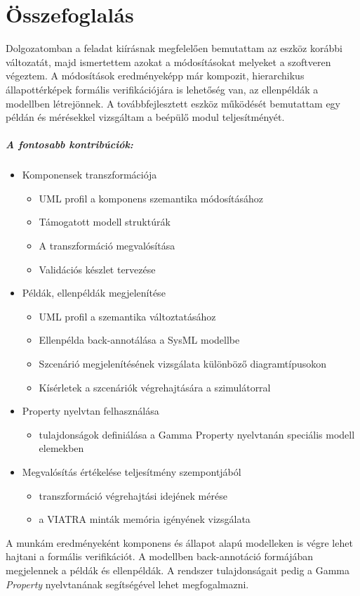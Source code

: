 \chapter{Összefoglalás}

Dolgozatomban a feladat kiírásnak megfelelően bemutattam az eszköz korábbi változatát, majd ismertettem azokat a módosításokat melyeket a szoftveren végeztem. A módosítások eredményeképp már kompozit, hierarchikus állapottérképek formális verifikációjára is lehetőség van, az ellenpéldák a modellben létrejönnek. A továbbfejlesztett eszköz működését bemutattam egy példán és mérésekkel vizsgáltam a beépülő modul teljesítményét.

\paragraph{A fontosabb kontribúciók:}
\begin{itemize}
	\item Komponensek transzformációja
		\begin{itemize}
			\item UML profil a komponens szemantika módosításához
			\item Támogatott modell struktúrák
			\item A transzformáció megvalósítása
			\item Validációs készlet tervezése
		\end{itemize}
	
	\item Példák, ellenpéldák megjelenítése
		\begin{itemize}
			\item UML profil a szemantika változtatásához
			\item Ellenpélda back-annotálása a SysML modellbe
			\item Szcenárió megjelenítésének vizsgálata különböző diagramtípusokon
			\item Kísérletek a szcenáriók végrehajtására a szimulátorral
		\end{itemize}
	\item Property nyelvtan felhasználása
		\begin{itemize}
			\item tulajdonságok definiálása a Gamma Property nyelvtanán speciális modell elemekben	
		\end{itemize}
	\item Megvalósítás értékelése teljesítmény szempontjából
		\begin{itemize}
			\item transzformáció végrehajtási idejének mérése
			\item a VIATRA minták memória igényének vizsgálata	
		\end{itemize}
\end{itemize}
A munkám eredményeként komponens és állapot alapú modelleken is végre lehet hajtani a formális verifikációt. A modellben back-annotáció formájában megjelennek a példák és ellenpéldák. A rendszer tulajdonságait pedig a Gamma \emph{Property} nyelvtanának segítségével lehet megfogalmazni.


